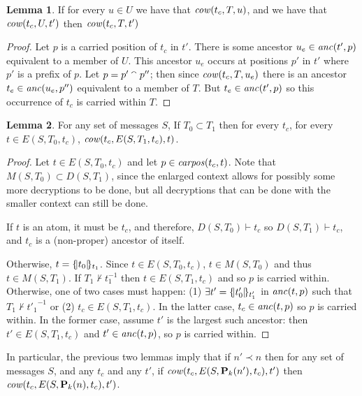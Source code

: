 \documentclass[12pt]{article}
\theoremstyle{definition}
\newtheorem{lem}{Lemma}[section]
\newcommand{\pubmsg}{\mathbf{P}}
\newcommand{\anc}{\fn{anc}}
\newcommand{\mcow}{\fn{cow}}
\begin{document}
\begin{lem}
\label{lem:cowtrans}
If for every $u \in U$ we have that $\mcow(t_c,T,u)$, and we have that $\mcow(t_c,U,t')$ then $\mcow(t_c,T,t')$
\end{lem}

\begin{proof}
Let $p$ is a carried position of $t_c$ in $t'$.  There is some ancestor $u_e \in \anc(t',p)$ equivalent to
a member of $U$.  This ancestor $u_e$ occurs at positions $p'$ in $t'$ where $p'$ is a prefix of $p$.  Let
$p = p' \mathbin{{}^\smallfrown} p''$; then since $\mcow(t_c,T,u_e)$ there is an ancestor $t_e \in \anc(u_e, p'')$ equivalent
to a member of $T$.  But $t_e \in \anc(t',p)$ so this occurrence of $t_c$ is carried within $T$.
\end{proof}

\begin{lem}
\label{lem:escapesetcow}
For any set of messages $S$, If $T_0 \subset T_1$ then for every $t_c$, for every $t \in E(S,T_0,t_c)$,
$\mcow(t_c,E(S,T_1,t_c),t)$.
\end{lem}

\begin{proof}
Let $t \in E(S,T_0,t_c)$ and let $p \in \operatorname{\mathit{carpos}}(t_c,t)$.  Note that $M(S,T_0) \subset D(S,T_1)$, 
since the enlarged context allows for possibly some more decryptions to be done, but all decryptions
that can be done with the smaller context can still be done.  

If $t$ is an atom, it must be $t_c$, and therefore, $D(S,T_0) \vdash t_c$ so $D(S,T_1) \vdash t_c$, 
and $t_c$ is a (non-proper) ancestor of itself.

Otherwise, $t = \{\!|t_0|\!\}_{t_1}$.  Since $t \in E(S,T_0,t_c)$, $t \in M(S,T_0)$ and thus $t \in M(S,T_1)$.
If $T_1 \not\vdash t_1^{-1}$ then $t \in E(S,T_1,t_c)$ and so $p$ is carried within.  Otherwise, 
one of two cases must happen: (1) $\exists t' = \{\!|t'_0|\!\}_{t'_1}$ in $\anc(t,p)$ such that $T_1 \not\vdash 
{t'_1}^{-1}$ or (2) $t_c \in E(S,T_1,t_c)$.  In the latter case, $t_c \in \anc(t,p)$ so $p$ is carried within.
In the former case, assume $t'$ is the largest such ancestor: then $t' \in E(S,T_1,t_c)$ and $t' \in \anc(t,p)$,
so $p$ is carried within.
\end{proof}

In particular, the previous two lemmas imply that if $n' \prec n$ then for any set of messages $S$,
and any $t_c$ and any $t'$, if $\mcow(t_c, E(S,\pubmsg_k(n'),t_c), t')$ then $\mcow(t_c, E(S,\pubmsg_k(n),t_c), t')$.
\end{document}
